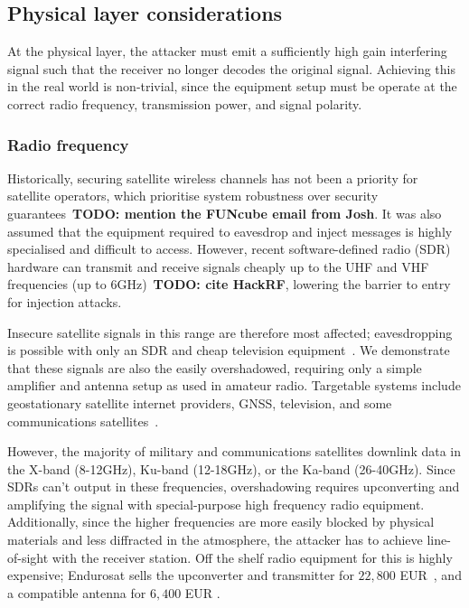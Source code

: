 \subsection{Physical layer considerations}

At the physical layer, the attacker must emit a sufficiently high gain interfering signal such that the receiver no longer decodes the original signal.
Achieving this in the real world is non-trivial, since the equipment setup must be operate at the correct radio frequency, transmission power, and signal polarity.

\subsubsection{Radio frequency}

Historically, securing satellite wireless channels has not been a priority for satellite operators, which prioritise system robustness over security guarantees~\textbf{TODO: mention the FUNcube email from Josh}.
It was also assumed that the equipment required to eavesdrop and inject messages is highly specialised and difficult to access.
However, recent software-defined radio (SDR) hardware can transmit and receive signals cheaply up to the UHF and VHF frequencies (up to 6GHz)~\textbf{TODO: cite HackRF}, lowering the barrier to entry for injection attacks.

Insecure satellite signals in this range are therefore most affected; eavesdropping is possible with only an SDR and cheap television equipment~\cite{pavur2020tale}.
We demonstrate that these signals are also the easily overshadowed, requiring only a simple amplifier and antenna setup as used in amateur radio.
Targetable systems include geostationary satellite internet providers, GNSS, television, and some communications satellites~\cite{esa_satellite_bands}.

However, the majority of military and communications satellites downlink data in the X-band (8-12GHz), Ku-band (12-18GHz), or the Ka-band (26-40GHz).
Since SDRs can't output in these frequencies, overshadowing requires upconverting and amplifying the signal with special-purpose high frequency radio equipment.
Additionally, since the higher frequencies are more easily blocked by physical materials and less diffracted in the atmosphere, the attacker has to achieve line-of-sight with the receiver station.
Off the shelf radio equipment for this is highly expensive; Endurosat sells the upconverter and transmitter for $22,800$ EUR~\cite{endurosat:xbandtransmitter}, and a compatible antenna for $6,400$ EUR \cite{endurosat:xbandantenna}.


